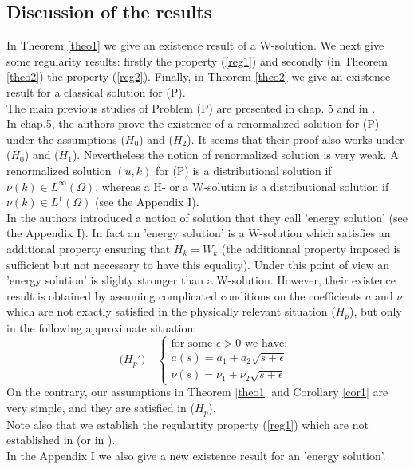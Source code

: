 \documentclass{elsart}
\begin{document}
\subsection{Discussion of the results} \label{sub1}

In Theorem \ref{theo1} we give an existence result of a
W-solution. We next give some regularity results: firstly the 
property (\ref{reg1}) and secondly (in Theorem \ref{theo2}) the property
(\ref{reg2}). Finally, in Theorem \ref{theo2} we give an existence result for a 
classical solution for (P). \\ 

The main previous studies of Problem (P) are presented in 
\cite{lewan} chap. 5 and in \cite{gal}. \\ 

In \cite{lewan} chap.5, the authors prove the existence of a
renormalized solution for (P) under the assumptions
($H_0$) and ($H_2$). It seems that
their proof also works under ($H_0$) and ($H_1$). Nevertheless the
notion of renormalized solution is very weak. A renormalized solution 
$(u,k)$ for (P) is a distributional solution if $\nu(k) \in 
L^{\infty}(\Omega)$, whereas a H- or a W-solution is a distributional
solution if $\nu(k) \in L^1(\Omega)$ (see the Appendix I). \\ 

In \cite{gal} the authors introduced a notion of solution that they
call 'energy solution' (see the Appendix I). In fact an 'energy solution' is a W-solution
which satisfies an additional property ensuring that $H_k = W_k$ 
(the additionnal property imposed is sufficient 
but not necessary to have this equality). Under this point of view an 
'energy solution' is slighty stronger than a W-solution. However, their 
existence result is obtained by assuming complicated conditions on the 
coefficients $a$ and $\nu$ which are not exactly satisfied in the
physically relevant situation ($H_p$), but only in the following approximate
situation: 
$$ 
\text{($H_p'$)}  \quad\left\{
	\begin{array}{l}
	  \text{for some }\epsilon > 0 \text{ we have: } \\ 
	  a(s) = a_1 + a_2 \sqrt{s+\epsilon} \\ 
	  \nu(s) = \nu_1 + \nu_2 \sqrt{s+\epsilon}
	  \end{array}
	\right. 
$$ 
On the contrary, our assumptions in Theorem \ref{theo1} and Corollary \ref{cor1} are
very simple, and they are satisfied in ($H_p$). \\ 
Note also that we establish the regulartity property 
(\ref{reg1}) which are not established in \cite{gal} (or in
\cite{lewan}). \\ 
In the Appendix I we also give a new existence result
for an 'energy solution'. \\ 
\end{document}
